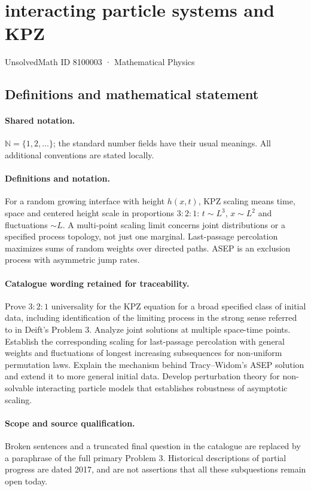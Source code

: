 \documentclass[11pt]{article}
\begin{document}
\setcounter{section}{8100002}
\section{interacting particle systems and KPZ}\label{8100003}
{\small UnsolvedMath ID 8100003 · Mathematical Physics}
\subsection{Definitions and mathematical statement}

\paragraph{Shared notation.}$\mathbb N=\{1,2,\ldots\}$; the standard number fields have their usual meanings. All additional conventions are stated locally.


\paragraph{Definitions and notation.}For a random growing interface with height $h(x,t)$, KPZ scaling means time, space and centered height scale in proportions $3:2:1$: $t\sim L^3$, $x\sim L^2$ and fluctuations $\sim L$. A multi-point scaling limit concerns joint distributions or a specified process topology, not just one marginal. Last-passage percolation maximizes sums of random weights over directed paths. ASEP is an exclusion process with asymmetric jump rates.

\paragraph{Catalogue wording retained for traceability.}
Prove $3:2:1$ universality for the KPZ equation for a broad specified class of initial data, including identification of the limiting process in the strong sense referred to in Deift’s Problem 3. Analyze joint solutions at multiple space-time points. Establish the corresponding scaling for last-passage percolation with general weights and fluctuations of longest increasing subsequences for non-uniform permutation laws. Explain the mechanism behind Tracy--Widom’s ASEP solution and extend it to more general initial data. Develop perturbation theory for non-solvable interacting particle models that establishes robustness of asymptotic scaling.
\paragraph{Scope and source qualification.}Broken sentences and a truncated final question in the catalogue are replaced by a paraphrase of the full primary Problem 3. Historical descriptions of partial progress are dated 2017, and are not assertions that all these subquestions remain open today.
\end{document}
